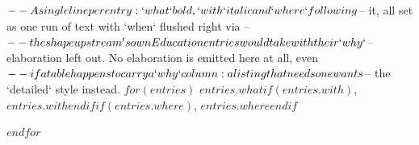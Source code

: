 $-- A single line per entry: `what` bold, `with` italic and `where` following
$-- it, all set as one run of text with `when` flushed right via \dates{} --
$-- the shape upstream's own Education entries would take with their `why`
$-- elaboration left out. No \smaller elaboration is emitted here at all, even
$-- if a table happens to carry a `why` column: a listing that needs one wants
$-- the `detailed` style instead.
$for(entries)$
\textbf{$entries.what$}$if(entries.with)$, \textit{$entries.with$}$endif$$if(entries.where)$, $entries.where$$endif$%
\is

$endfor$
